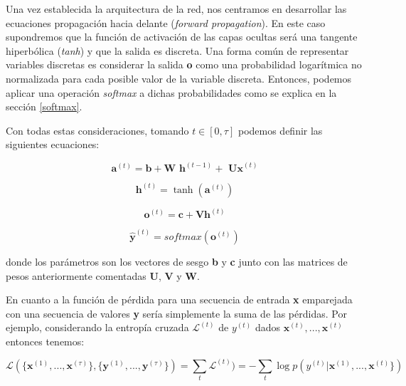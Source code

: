 	Una vez establecida la arquitectura de la red, nos centramos en desarrollar las ecuaciones propagación hacia delante (\textit{forward propagation}).  En este caso supondremos que la función de activación de las capas ocultas será una tangente hiperbólica (\textit{tanh}) y que la salida es discreta. Una forma común de representar variables discretas es considerar la salida \textbf{o} como una probabilidad logarítmica no normalizada para cada posible valor de la variable discreta. Entonces, podemos aplicar una operación \textit{softmax} a dichas probabilidades como se explica en la sección \ref{softmax}.
	
	Con todas estas consideraciones, tomando $t \in [0, \tau]$ podemos definir las siguientes ecuaciones:
	
	\begin{equation}\label{1}
		\textbf{a}^{(t)} = \textbf{b} + \textbf{W h}^{(t-1)} +\textbf{ Ux}^{(t)}
	\end{equation} 
	
	\begin{equation}	
		\textbf{h}^{(t)} = \tanh(\textbf{a}^{(t)})
	\end{equation}
	
	\begin{equation}
		\textbf{o}^{(t)} = \textbf{c} + \textbf{Vh}^{(t)}
	\end{equation}
	
	\begin{equation}\label{2}
		\hat{\textbf{{y}}}^{(t)} = softmax(\textbf{o}^{(t)} )
	\end{equation}
	
	donde los parámetros son los vectores de sesgo \textbf{b} y \textbf{c} junto con las matrices de pesos anteriormente comentadas \textbf{U}, \textbf{V} y \textbf{W}. 
	
	En cuanto a la función de pérdida para una secuencia de entrada \textbf{x} emparejada con una secuencia de valores \textbf{y} sería simplemente la suma de las pérdidas. Por ejemplo, considerando la entropía cruzada $\mathcal{L}^{(t)}$ de $y^{(t)}$ dados $\textbf{x}^{(t)}, ..., \textbf{x}^{(t)}$ entonces tenemos:
	
	\begin{equation}
			\mathcal{L}(\{ \textbf{x}^{(1)}, ..., \textbf{x}^{(\tau)} \}, \{ \textbf{y}^{(1)}, ..., \textbf{y}^{(\tau)} \}) = \sum_{t}\mathcal{L}^{(t)} ) = 
			- \sum_{t} \log p(y^{(t)} | \textbf{x}^{(1)}, ..., \textbf{x}^{(t)} \})
	\end{equation}
	
